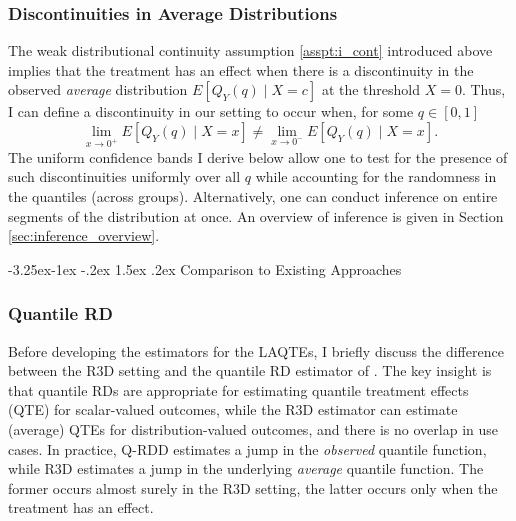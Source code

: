 \documentclass[12pt]{article}
\makeatletter
\renewcommand\subsection{\@startsection{subsection}{2}{\z@}%
  {-3.25ex\@plus -1ex \@minus -.2ex}%
  {1.5ex \@plus .2ex}%
  {\itshape\large\center}} %
\makeatother
\begin{document}
\subsubsection{Discontinuities in Average Distributions}

The weak distributional continuity assumption \ref{asspt:i_cont} introduced above implies that the treatment has an effect when there is a discontinuity in the observed \textit{average} distribution $E[Q_Y(q) \mid X =c]$ at the threshold $X=0$. Thus, I can define a discontinuity in our setting to occur when, for some $q \in [0,1]$
\[
\lim_{x\to 0^+} E[Q_Y(q) \mid X =x] \neq \lim_{x\to 0^-} E[Q_Y(q) \mid X =x].
\]
The uniform confidence bands I derive below allow one to test for the presence of such discontinuities uniformly over all $q$ while accounting for the randomness in the quantiles (across groups). Alternatively, one can conduct inference on entire segments of the distribution at once. An overview of inference is given in Section \ref{sec:inference_overview}.

\subsection{Comparison to Existing Approaches} \label{sec:quantile_comparison}

\subsubsection{Quantile RD}

Before developing the estimators for the LAQTEs, I briefly discuss the difference between the R3D setting and the quantile RD estimator of \citet{frandsen2012quantile}. The key insight is that quantile RDs are appropriate for estimating quantile treatment effects (QTE) for scalar-valued outcomes, while the R3D estimator can estimate (average) QTEs for distribution-valued outcomes, and there is no overlap in use cases. In practice, Q-RDD estimates a jump in the \textit{observed} quantile function, while R3D estimates a jump in the underlying \textit{average} quantile function. The former occurs almost surely in the R3D setting, the latter occurs only when the treatment has an effect. 
\end{document}
